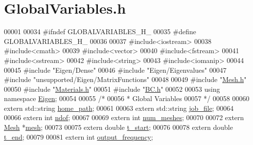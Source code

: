 \hypertarget{_global_variables_8h_source}{}\section{Global\+Variables.\+h}
\label{_global_variables_8h_source}

\begin{DoxyCode}
00001 
00034 \textcolor{preprocessor}{#ifndef GLOBALVARIABLES\_H\_}
00035 \textcolor{preprocessor}{#define GLOBALVARIABLES\_H\_}
00036 
00037 \textcolor{preprocessor}{#include<iostream>}
00038 \textcolor{preprocessor}{#include<cmath>}
00039 \textcolor{preprocessor}{#include<vector>}
00040 \textcolor{preprocessor}{#include<fstream>}
00041 \textcolor{preprocessor}{#include<sstream>}
00042 \textcolor{preprocessor}{#include<string>}
00043 \textcolor{preprocessor}{#include<iomanip>}
00044 
00045 \textcolor{preprocessor}{#include "Eigen/Dense"}
00046 \textcolor{preprocessor}{#include "Eigen/Eigenvalues"}
00047 \textcolor{preprocessor}{#include "unsupported/Eigen/MatrixFunctions"}
00048 
00049 \textcolor{preprocessor}{#include "\hyperlink{_mesh_8h}{Mesh.h}"}
00050 \textcolor{preprocessor}{#include "\hyperlink{_materials_8h}{Materials.h}"}
00051 \textcolor{preprocessor}{#include "\hyperlink{_b_c_8h}{BC.h}"}
00052 
00053 \textcolor{keyword}{using namespace }\hyperlink{namespace_eigen}{Eigen};
00054 
00055 \textcolor{comment}{/*}
00056 \textcolor{comment}{ * Global Variables}
00057 \textcolor{comment}{ */}
00058 
00060 \textcolor{keyword}{extern} std::string \hyperlink{_global_variables_8h_a556ce46e457f991c51f3dac111579e2b}{home\_path};
00061 
00063 \textcolor{keyword}{extern} std::string \hyperlink{_global_variables_8h_a5e3d7c3d50f127de0e61daaa407dc7d1}{job\_file};
00064 
00066 \textcolor{keyword}{extern} \textcolor{keywordtype}{int} \hyperlink{_global_variables_8h_aa789fe4d8a13fd0990b630909430d5d0}{ndof};
00067 
00069 \textcolor{keyword}{extern} \textcolor{keywordtype}{int} \hyperlink{_global_variables_8h_a509bc84434af1eff0173e4a71bd758ac}{num\_meshes};
00070 
00072 \textcolor{keyword}{extern} \hyperlink{class_mesh}{Mesh} *\hyperlink{_global_variables_8h_a6e08f89b32254fb4b129720418e7c6ea}{mesh};
00073 
00075 \textcolor{keyword}{extern} \textcolor{keywordtype}{double} \hyperlink{_global_variables_8h_a1b01a4354147da92a548ea1a5f96d592}{t\_start};
00076 
00078 \textcolor{keyword}{extern} \textcolor{keywordtype}{double} \hyperlink{_global_variables_8h_a4b637c5fff609e604a3b2b2787f4a9fa}{t\_end};
00079 
00081 \textcolor{keyword}{extern} \textcolor{keywordtype}{int} \hyperlink{_global_variables_8h_ace6ace9b2f6d8d404ca9e66564289eb1}{output\_frequency};

\end{DoxyCode}
